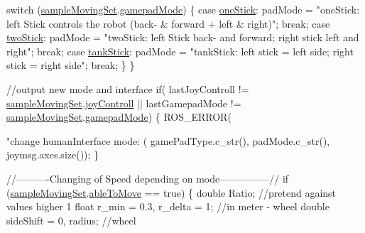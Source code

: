 \begin{DoxyCode}
        \textcolor{keywordflow}{switch} (\hyperlink{classSampleMoving_af9c7dc0be1c4197469fbfa7aa105f1cc}{sampleMovingSet}.\hyperlink{structSampleMoving_1_1sampleMovingSettingStruct_a1b3cbdffd2c270871b009022b1f65eb0}{gamepadMode}) \{
            \textcolor{keywordflow}{case} \hyperlink{classSampleMoving_ad45933bb8e660772ea25747d3446bd8aaf949a715587ed74b5cb1f8199e3f369d}{oneStick}:  padMode = \textcolor{stringliteral}{"oneStick: left Stick controls
       the robot (back- & forward + left & right)"};
                            \textcolor{keywordflow}{break};
            \textcolor{keywordflow}{case} \hyperlink{classSampleMoving_ad45933bb8e660772ea25747d3446bd8aa34ec1e09ac95890b7840157db35fe828}{twoStick}:  padMode = \textcolor{stringliteral}{"twoStick: left Stick back- and
       forward; right stick left and right"};
                            \textcolor{keywordflow}{break};
            \textcolor{keywordflow}{case} \hyperlink{classSampleMoving_ad45933bb8e660772ea25747d3446bd8aaa424c4ac1573cab2407925cf755474ba}{tankStick}: padMode = \textcolor{stringliteral}{"tankStick: left stick = left
       side; right stick = right side"};
                            \textcolor{keywordflow}{break};
        \}
    \}

    \textcolor{comment}{//output new mode and interface}
    \textcolor{keywordflow}{if}( lastJoyControll != \hyperlink{classSampleMoving_af9c7dc0be1c4197469fbfa7aa105f1cc}{sampleMovingSet}.\hyperlink{structSampleMoving_1_1sampleMovingSettingStruct_abcbeb9363905012770950c4908a4e1aa}{joyControll}
       || lastGamepadMode != \hyperlink{classSampleMoving_af9c7dc0be1c4197469fbfa7aa105f1cc}{sampleMovingSet}.\hyperlink{structSampleMoving_1_1sampleMovingSettingStruct_a1b3cbdffd2c270871b009022b1f65eb0}{gamepadMode}) \{
        ROS\_ERROR(\textcolor{stringliteral}{"change humanInterface mode: (%
      gamePadType.c\_str(), padMode.c\_str(), joymsg.axes.size());
    \}

\textcolor{comment}{//----------Changing of Speed depending on mode---------------//}
    \textcolor{keywordflow}{if} (\hyperlink{classSampleMoving_af9c7dc0be1c4197469fbfa7aa105f1cc}{sampleMovingSet}.\hyperlink{structSampleMoving_1_1sampleMovingSettingStruct_a14089eeff8e96683e056b50c6ae6a998}{ableToMove} == \textcolor{keyword}{true}) \{
        \textcolor{keywordtype}{double} Ratio;   \textcolor{comment}{//pretend against values higher 1}
        \textcolor{keywordtype}{float} r\_min = 0.3, r\_delta = 1; \textcolor{comment}{//in meter - wheel}
        \textcolor{keywordtype}{double} sideShift = 0, radius;   \textcolor{comment}{//wheel}

}
\end{DoxyCode}
